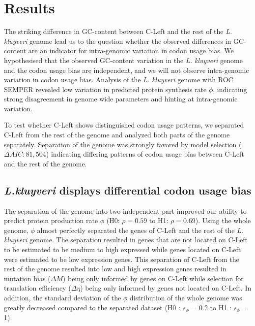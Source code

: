 \documentclass[12pt,draft]{article}
\begin{document}
	
\section*{Results}
The striking difference in GC-content between C-Left and the rest of the \textit{L. kluyveri} genome lead us to the question whether the observed differences in GC-content are an indicator for intra-genomic variation in codon usage bias.
We hypothesised that the observed GC-content variation in the \textit{L. kluyveri} genome and the codon usage bias are independent, and we will not observe intra-genomic variation in codon usage bias.
Analysis of the \textit{L. kluyveri} genome with ROC SEMPER revealed low variation in predicted protein synthesis rate $\phi$, indicating strong disagreement in genome wide parameters and hinting at intra-genomic variation.
  
To test whether C-Left shows distinguished codon usage patterns, we separated C-Left from the rest of the genome and analyzed both parts of the genome separately.
Separation of the genome was strongly favored by model selection ($\Delta AIC: 81,504$) indicating differing patterns of codon usage bias between C-Left and the rest of the genome.

\subsection*{\textit{L.kluyveri} displays differential codon usage bias}
The separation of the genome into two independent part improved our ability to predict protein production rate $\phi$ (H0: $\rho = 0.59$ to H1: $\rho = 0.69$).
Using the whole genome, $\phi$ almost perfectly separated the genes of C-Left and the rest of the \textit{L. kluyveri} genome. 
The separation resulted in genes that are not located on C-Left to be estimated to be medium to high expressed while genes located on C-Left were estimated to be low expression genes. 
This separation of C-Left from the rest of the genome resulted into low and high expression genes resulted in mutation bias ($\Delta M$) being only informed by genes on C-Left while selection for translation efficiency ($\Delta \eta$) being only informed by genes not located on C-Left. 
In addition, the standard deviation of the $\phi$ distribution of the whole genome was greatly decreased compared to the separated dataset (H0 : $s_{\phi}$ = 0.2 to H1 : $s_{\phi}$ = 1).
\end{document}
